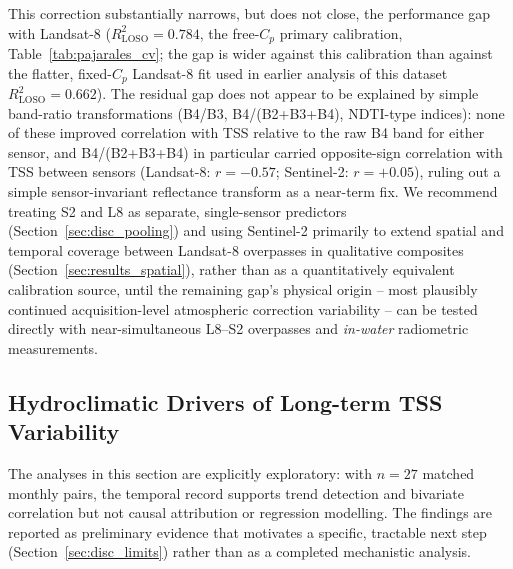 \documentclass[remotesensing,article,submit,pdftex,moreauthors]{Definitions/mdpi}
\begin{document}
This correction substantially narrows, but does not close, the
performance gap with Landsat-8 ($R^2_{\text{LOSO}} = 0.784$, the
free-$C_p$ primary calibration, Table~\ref{tab:pajarales_cv}; the gap is
wider against this calibration than against the flatter, fixed-$C_p$
Landsat-8 fit used in earlier analysis of this dataset
$R^2_{\text{LOSO}} = 0.662$). The
residual gap does not appear to be explained by simple band-ratio
transformations (B4/B3, B4/(B2+B3+B4), NDTI-type indices): none of
these improved correlation with TSS relative to the raw B4 band for
either sensor, and B4/(B2+B3+B4) in particular carried opposite-sign
correlation with TSS between sensors (Landsat-8: $r = -0.57$;
Sentinel-2: $r = +0.05$), ruling out a simple sensor-invariant
reflectance transform as a near-term fix. We recommend treating S2 and
L8 as separate, single-sensor predictors (Section~\ref{sec:disc_pooling})
and using Sentinel-2 primarily to extend spatial and temporal coverage
between Landsat-8 overpasses in qualitative composites
(Section~\ref{sec:results_spatial}), rather than as a quantitatively
equivalent calibration source, until the remaining gap's physical
origin -- most plausibly continued acquisition-level atmospheric
correction variability -- can be tested directly with near-simultaneous
L8--S2 overpasses and \textit{in-water} radiometric measurements.
 
 
\subsection{Hydroclimatic Drivers of Long-term TSS Variability}
\label{sec:disc_hydro}
 
The analyses in this section are explicitly exploratory: with $n = 27$
matched monthly pairs, the temporal record supports trend detection and
bivariate correlation but not causal attribution or regression
modelling. The findings are reported as preliminary evidence that
motivates a specific, tractable next step (Section~\ref{sec:disc_limits})
rather than as a completed mechanistic analysis.
\end{document}
